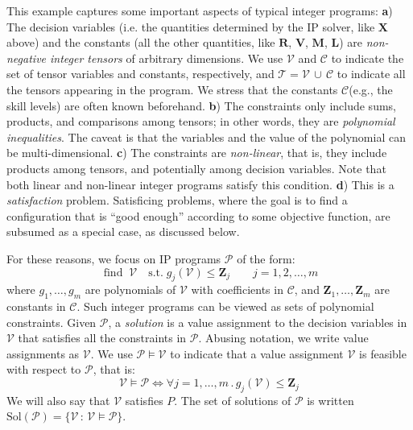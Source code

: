 \documentclass{article}
\newcommand{\stefano}[1]{{\bf \textcolor{violet}{{Stefano: #1}}}}
\newcommand{\tensors}{\ensuremath{\mathcal{T}}\xspace}
\newcommand{\variables}{\ensuremath{\mathcal{V}}\xspace}
\newcommand{\constants}{\ensuremath{\mathcal{C}}\xspace}
\newcommand{\program}{\ensuremath{\mathcal{P}}\xspace}
\newcommand{\SOL}[1]{\ensuremath{\mathrm{Sol}\left(#1\right)}\xspace}
\DeclareMathOperator*{\find}{find}
\renewcommand\[{\begin{equation}}
\renewcommand\]{\end{equation}}
\newcommand{\TL}{\textbf{L}\xspace}
\newcommand{\TM}{\textbf{M}\xspace}
\newcommand{\TR}{\textbf{R}\xspace}
\newcommand{\TV}{\textbf{V}\xspace}
\newcommand{\TX}{\textbf{X}\xspace}
\newcommand{\TZ}{\textbf{Z}\xspace}
\begin{document}
This example captures some important aspects of typical integer programs:
%
\textbf{a}) The decision variables (i.e. the quantities determined by the IP
solver, like $\TX$ above) and the constants (all the other quantities, like
$\TR$, $\TV$, $\TM$, $\TL$) are \emph{non-negative integer tensors} of
arbitrary dimensions.  We use \variables and \constants to indicate the set of
tensor variables and constants, respectively, and $\tensors =
\variables\,\cup\,\constants$ to indicate all the tensors appearing in the
program.  We stress that the constants \constants (e.g., the skill levels) are
often known beforehand.
%
\textbf{b}) The constraints only include sums, products, and comparisons among
tensors; in other words, they are \emph{polynomial inequalities}.  The caveat
is that the variables and the value of the polynomial can be multi-dimensional.
%
\textbf{c}) The constraints are \emph{non-linear}, that is, they include
products among tensors, and potentially among decision variables.  Note that
both linear and non-linear integer programs satisfy this condition.
%
\textbf{d}) This is a \emph{satisfaction} problem.
Satisficing problems, where the goal is to find a configuration that is ``good
enough'' according to some objective function, are subsumed as a special case,
as discussed below.

For these reasons, we focus on IP programs \program of the form:
%
$$
    \find \; \variables \quad 
    \text{s.t.}
        \; g_j(\variables) \le \TZ_j
        \qquad j = 1, 2, \ldots, m
$$
%
where $g_1, \ldots, g_m$ are polynomials of \variables with coefficients in
\constants, and $\TZ_1, \ldots, \TZ_m$ are constants in \constants.
%
Such integer programs can be viewed as sets of polynomial constraints.  Given
\program, a \emph{solution} is a value assignment to the decision variables in
\variables that satisfies all the constraints in \program.  Abusing notation,
we write value assignments as \variables.  We use $\program \models \variables$
to indicate that a value assignment $\variables$ is feasible with respect to
\program, that is:
%
$$
    \variables \models \program \iff \forall j = 1, \ldots, m \,.\, g_j(\variables) \le \TZ_j
$$
%
We will also say that $\variables$ satisfies $P$.  The set of solutions of
$\program$ is written
$\SOL{\program} = \{\variables \,:\,  \variables \models \program\}$.
\end{document}
